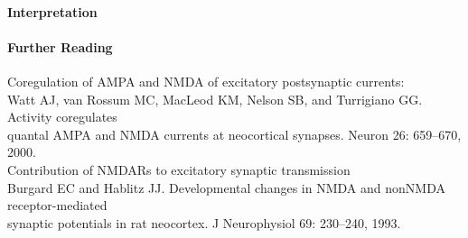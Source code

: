 \documentclass[11pt]{article}
\begin{document}
\paragraph{Interpretation}

\paragraph{Further Reading}
Coregulation of AMPA and NMDA of excitatory postsynaptic currents: \\
\hspace*{0.5in} Watt AJ, van Rossum MC, MacLeod KM, Nelson SB, and Turrigiano GG. Activity coregulates \\
\hspace*{0.5in} quantal AMPA and NMDA currents at neocortical synapses. Neuron 26: 659–670, 2000. \\
Contribution of NMDARs to excitatory synaptic transmission  \\
\hspace*{0.5in} Burgard EC and Hablitz JJ. Developmental changes in NMDA and nonNMDA receptor-mediated \\
\hspace*{0.5in} synaptic potentials in rat neocortex. J Neurophysiol 69: 230–240, 1993. \\
\end{document}
